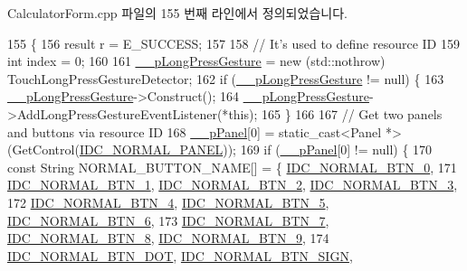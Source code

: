 Calculator\+Form.\+cpp 파일의 155 번째 라인에서 정의되었습니다.


\begin{DoxyCode}
155                                               \{
156     result r = E\_SUCCESS;
157 
158     \textcolor{comment}{// It's used to define resource ID}
159     \textcolor{keywordtype}{int} index = 0;
160 
161     \hyperlink{class_calculator_form_ae2c4d24712fa767d536ffc901810bff3}{\_\_pLongPressGesture} = \textcolor{keyword}{new} (std::nothrow) TouchLongPressGestureDetector;
162     \textcolor{keywordflow}{if} (\hyperlink{class_calculator_form_ae2c4d24712fa767d536ffc901810bff3}{\_\_pLongPressGesture} != null) \{
163         \hyperlink{class_calculator_form_ae2c4d24712fa767d536ffc901810bff3}{\_\_pLongPressGesture}->Construct();
164         \hyperlink{class_calculator_form_ae2c4d24712fa767d536ffc901810bff3}{\_\_pLongPressGesture}->AddLongPressGestureEventListener(*\textcolor{keyword}{this});
165     \}
166 
167     \textcolor{comment}{// Get two panels and buttons via resource ID}
168     \hyperlink{class_calculator_form_ae930aeea4ccaf0fd752c11350c6e2af6}{\_\_pPanel}[0] = \textcolor{keyword}{static\_cast<}Panel *\textcolor{keyword}{>}(GetControl(\hyperlink{_app_resource_id_8h_accece1bbd97e4a4d082e7a3a484107df}{IDC\_NORMAL\_PANEL}));
169     \textcolor{keywordflow}{if} (\hyperlink{class_calculator_form_ae930aeea4ccaf0fd752c11350c6e2af6}{\_\_pPanel}[0] != null) \{
170         \textcolor{keyword}{const} String NORMAL\_BUTTON\_NAME[] = \{ \hyperlink{_app_resource_id_8h_a1f7660747d5ed786a82ec176bd083b27}{IDC\_NORMAL\_BTN\_0},
171                 \hyperlink{_app_resource_id_8h_af6344047dfe98f8b29982f1bf17adf0d}{IDC\_NORMAL\_BTN\_1}, \hyperlink{_app_resource_id_8h_aaa34554e2db9829795e32310a06d2d64}{IDC\_NORMAL\_BTN\_2}, 
      \hyperlink{_app_resource_id_8h_ad9679322635ce6467647201e84f2da60}{IDC\_NORMAL\_BTN\_3},
172                 \hyperlink{_app_resource_id_8h_a7b4c2e8446933c3ad2c05721b53345b5}{IDC\_NORMAL\_BTN\_4}, \hyperlink{_app_resource_id_8h_a3a57f54dbb2d3a0114fa48d1e9cd4e82}{IDC\_NORMAL\_BTN\_5}, 
      \hyperlink{_app_resource_id_8h_a47704f02123423e59e24ffaa98c998d3}{IDC\_NORMAL\_BTN\_6},
173                 \hyperlink{_app_resource_id_8h_aa0f9eb580979b7ec5f61ea0dffdac95d}{IDC\_NORMAL\_BTN\_7}, \hyperlink{_app_resource_id_8h_a6fcb1c5cb0d862d26820c8b2471d9565}{IDC\_NORMAL\_BTN\_8}, 
      \hyperlink{_app_resource_id_8h_a7b7727e20d05cda297763fd470ecfa45}{IDC\_NORMAL\_BTN\_9},
174                 \hyperlink{_app_resource_id_8h_a584b81b4057fd6b8354212d377dc6d6e}{IDC\_NORMAL\_BTN\_DOT}, \hyperlink{_app_resource_id_8h_a61871bbefe205a6642db57471a5935ee}{IDC\_NORMAL\_BTN\_SIGN}, 

\end{DoxyCode}
